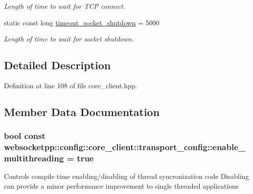 \begin{DoxyCompactItemize}
\begin{DoxyCompactList}\small\item\em Length of time to wait for T\+CP connect. \end{DoxyCompactList}\item 
static const long \hyperlink{structwebsocketpp_1_1config_1_1core__client_1_1transport__config_a1b3c52afc3596f891611208c0773bc8c}{timeout\+\_\+socket\+\_\+shutdown} = 5000\hypertarget{structwebsocketpp_1_1config_1_1core__client_1_1transport__config_a1b3c52afc3596f891611208c0773bc8c}{}\label{structwebsocketpp_1_1config_1_1core__client_1_1transport__config_a1b3c52afc3596f891611208c0773bc8c}

\begin{DoxyCompactList}\small\item\em Length of time to wait for socket shutdown. \end{DoxyCompactList}\end{DoxyCompactItemize}


\subsection{Detailed Description}


Definition at line 108 of file core\+\_\+client.\+hpp.



\subsection{Member Data Documentation}
\subsubsection[{\texorpdfstring{enable\+\_\+multithreading}{enable\_multithreading}}]{\setlength{\rightskip}{0pt plus 5cm}bool const websocketpp\+::config\+::core\+\_\+client\+::transport\+\_\+config\+::enable\+\_\+multithreading = true\hspace{0.3cm}{\ttfamily [static]}}\hypertarget{structwebsocketpp_1_1config_1_1core__client_1_1transport__config_a79238a5db7c8a95065e998309b4f424c}{}\label{structwebsocketpp_1_1config_1_1core__client_1_1transport__config_a79238a5db7c8a95065e998309b4f424c}
Controls compile time enabling/disabling of thread syncronization code Disabling can provide a minor performance improvement to single threaded applications 

